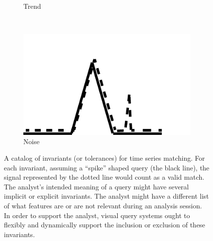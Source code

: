 {\begin{figure}
\begin{subfigure}{.45\columnwidth}
 		\caption{Trend}
 	\end{subfigure}
 	~
 	\begin{subfigure}{.45\columnwidth}
 		\includegraphics[width=\textwidth]{./figures/invariants/noise}
 		\caption{Noise}
 	\end{subfigure}
 	\caption{A catalog of invariants (or tolerances) for time series matching. For each invariant, assuming a ``spike'' shaped query (the black line), the signal represented by the dotted line would count as a valid match. The analyst's intended meaning of a query might have several implicit or explicit invariants. The analyst might have a different list of what features are or are not relevant during an analysis session. In order to support the analyst, visual query systems ought to flexibly and dynamically support the inclusion or exclusion of these invariants.  }
 	\label{fig:invarlist}
 \end{figure}	
}

